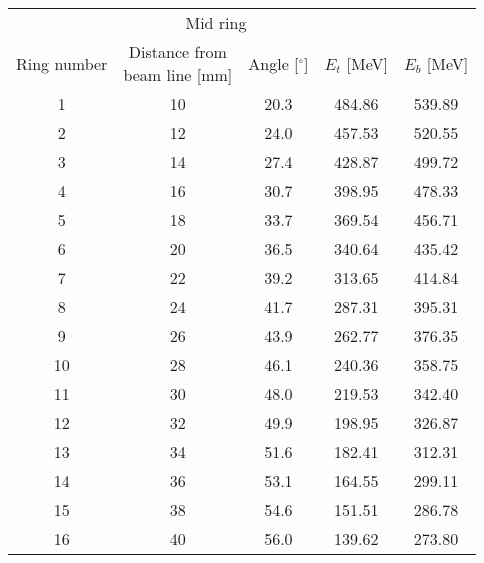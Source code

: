 \begin{tabular}{ccccc}
\hline
            & \multicolumn{2}{c}{Mid ring}                                     &             &             \\
Ring number & \shortstack{Distance from \\ beam line [mm]}  & Angle [$^\circ$] & $E_t$ [MeV] & $E_b$ [MeV] \\
\hline
1           & 10                                            & 20.3             & 484.86      & 539.89      \\
2           & 12                                            & 24.0             & 457.53      & 520.55      \\
3           & 14                                            & 27.4             & 428.87      & 499.72      \\
4           & 16                                            & 30.7             & 398.95      & 478.33      \\
5           & 18                                            & 33.7             & 369.54      & 456.71      \\
6           & 20                                            & 36.5             & 340.64      & 435.42      \\
7           & 22                                            & 39.2             & 313.65      & 414.84      \\
8           & 24                                            & 41.7             & 287.31      & 395.31      \\
9           & 26                                            & 43.9             & 262.77      & 376.35      \\
10          & 28                                            & 46.1             & 240.36      & 358.75      \\
11          & 30                                            & 48.0             & 219.53      & 342.40      \\
12          & 32                                            & 49.9             & 198.95      & 326.87      \\
13          & 34                                            & 51.6             & 182.41      & 312.31      \\
14          & 36                                            & 53.1             & 164.55      & 299.11      \\
15          & 38                                            & 54.6             & 151.51      & 286.78      \\
16          & 40                                            & 56.0             & 139.62      & 273.80      \\
\hline
\end{tabular}